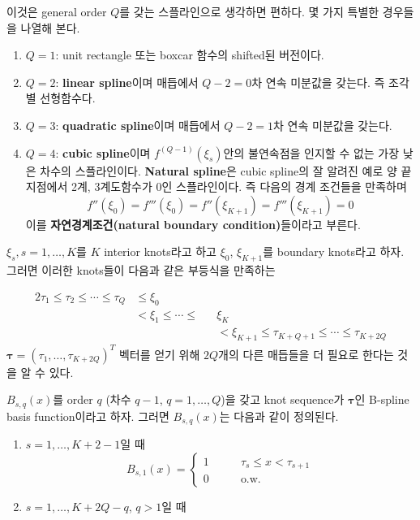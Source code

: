 \documentclass[b5paper,]{scrbook}
\theoremstyle{plain}
\theoremstyle{definition}
\numberwithin{equation}{section}
\begin{document}
이것은 general order \(Q\)를 갖는 스플라인으로 생각하면 편하다. 몇 가지 특별한 경우들을 나열해 본다.

\begin{enumerate}
\def\labelenumi{\arabic{enumi}.}
\item
  \(Q=1\): unit rectangle 또는 boxcar 함수의 shifted된 버전이다.
\item
  \(Q=2\): \textbf{linear spline}이며 매듭에서 \(Q-2=0\)차 연속 미분값을 갖는다. 즉 조각별 선형함수다.
\item
  \(Q=3\): \textbf{quadratic spline}이며 매듭에서 \(Q-2=1\)차 연속 미분값을 갖는다.
\item
  \(Q=4\): \textbf{cubic spline}이며 \(f^{(Q-1)}(\xi_{s})\)안의 불연속점을 인지할 수 없는 가장 낮은 차수의 스플라인이다. \citep{Hastie2009} \textbf{Natural spline}은 cubic spline의 잘 알려진 예로 양 끝지점에서 2계, 3계도함수가 0인 스플라인이다. 즉 다음의 경계 조건들을 만족하며
  \[f''(\xi_{0})=f'''(\xi_{0})=f''(\xi_{K+1})=f'''(\xi_{K+1})=0\]
  이를 \textbf{자연경계조건(natural boundary condition)}들이라고 부른다.
\end{enumerate}

\(\xi_{s}, s=1,\ldots, K\)를 \(K\) interior knots라고 하고 \(\xi_{0}\), \(\xi_{K+1}\)를 boundary knots라고 하자. 그러면 이러한 knots들이 다음과 같은 부등식을 만족하는

\begin{alignat*}{2}
\tau_{1}\leq \tau_{2} \leq \cdots \leq \tau_{Q} &\leq \xi_{0} && \\
&< \xi_{1} \leq \cdots \leq &&\xi_{K}\\
& &&< \xi_{K+1} \leq \tau_{K+Q+1} \leq \cdots \leq \tau_{K+2Q}
\end{alignat*}
\(\boldsymbol{\tau}=(\tau_{1}, \ldots, \tau_{K+2Q})^{T}\) 벡터를 얻기 위해 \(2Q\)개의 다른 매듭들을 더 필요로 한다는 것을 알 수 있다.

\(B_{s,q}(x)\)를 order \(q\) (차수 \(q-1\), \(q=1,\ldots, Q\))을 갖고 knot sequence가 \(\boldsymbol{\tau}\)인 B-spline basis function이라고 하자. 그러면 \(B_{s,q}(x)\)는 다음과 같이 정의된다.

\begin{enumerate}
\def\labelenumi{\arabic{enumi}.}
\item
  \(s=1,\ldots, K+2-1\)일 때
  \[B_{s,1}(x)=
  \begin{cases}
  1 & \qquad{\tau_{s} \leq x < \tau_{s+1}}\\
  0 & \qquad{\text{o.w.}}
  \end{cases}\]
\item
  \(s=1,\ldots, K+2Q-q\), \(q>1\)일 때
\end{enumerate}
\end{document}
